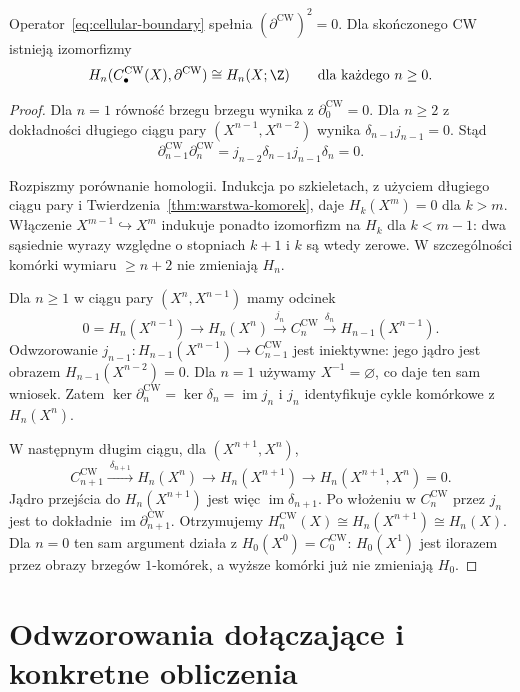 \begin{twierdzenie}
\label{thm:komorkowa-singularna}
Operator~\eqref{eq:cellular-boundary}
spełnia $(\partial^{\mathrm{CW}})^2=0$.
Dla skończonego CW istnieją
izomorfizmy
\[
 H_n(C_\bullet^{\mathrm{CW}}(X),
       \partial^{\mathrm{CW}})
 \cong H_n(X;\Z)
 \qquad\text{dla każdego }n\geq0.
\]
\end{twierdzenie}
\begin{proof}
Dla $n=1$ równość brzegu brzegu wynika z $\partial_0^{\mathrm{CW}}=0$.
Dla $n\geq2$ z dokładności długiego ciągu
pary $(X^{n-1},X^{n-2})$
wynika $\delta_{n-1}j_{n-1}=0$.
Stąd
\[
 \partial^{\mathrm{CW}}_{n-1}
 \partial^{\mathrm{CW}}_n
 =j_{n-2}\delta_{n-1}j_{n-1}\delta_n=0.
\]

Rozpiszmy porównanie homologii.
Indukcja po szkieletach,
z użyciem długiego ciągu pary
i Twierdzenia~\ref{thm:warstwa-komorek},
daje $H_k(X^m)=0$ dla $k>m$.
Włączenie $X^{m-1}\hookrightarrow X^m$
indukuje ponadto izomorfizm na
$H_k$ dla $k<m-1$: dwa sąsiednie
wyrazy względne o stopniach
$k+1$ i $k$ są wtedy zerowe.
W szczególności komórki wymiaru
$\geq n+2$ nie zmieniają $H_n$.

Dla $n\geq1$ w ciągu pary
$(X^n,X^{n-1})$ mamy odcinek
\[
 0=H_n(X^{n-1})\longrightarrow
 H_n(X^n)\xrightarrow{\ j_n\ }
 C_n^{\mathrm{CW}}
 \xrightarrow{\ \delta_n\ }
 H_{n-1}(X^{n-1}).
\]
Odwzorowanie $j_{n-1}:H_{n-1}(X^{n-1})
\to C_{n-1}^{\mathrm{CW}}$
jest iniektywne: jego jądro
jest obrazem
$H_{n-1}(X^{n-2})=0$.
Dla $n=1$ używamy
$X^{-1}=\varnothing$, co daje
ten sam wniosek.
Zatem $\ker\partial_n^{\mathrm{CW}}
=\ker\delta_n=\operatorname{im}j_n$
i $j_n$ identyfikuje cykle
komórkowe z $H_n(X^n)$.

W następnym długim ciągu,
dla $(X^{n+1},X^n)$,
\[
 C_{n+1}^{\mathrm{CW}}
 \xrightarrow{\ \delta_{n+1}\ }
 H_n(X^n)\longrightarrow
 H_n(X^{n+1})\longrightarrow
 H_n(X^{n+1},X^n)=0.
\]
Jądro przejścia do $H_n(X^{n+1})$
jest więc $\operatorname{im}\delta_{n+1}$.
Po włożeniu w $C_n^{\mathrm{CW}}$
przez $j_n$ jest to dokładnie
$\operatorname{im}\partial_{n+1}^{\mathrm{CW}}$.
Otrzymujemy
$H_n^{\mathrm{CW}}(X)\cong
H_n(X^{n+1})\cong H_n(X)$.
Dla $n=0$ ten sam argument działa
z $H_0(X^0)=C_0^{\mathrm{CW}}$:
$H_0(X^1)$ jest ilorazem przez
obrazy brzegów $1$-komórek,
a wyższe komórki już nie
zmieniają $H_0$.
\end{proof}

\section{Odwzorowania dołączające i konkretne obliczenia}
\label{sec:obliczenia-homologii}

